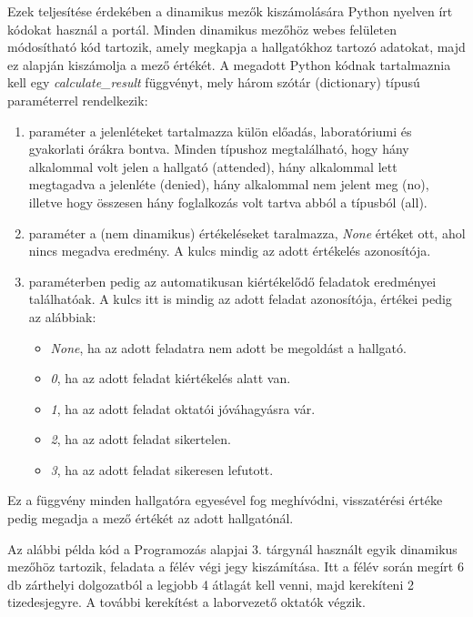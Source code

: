 Ezek teljesítése érdekében a dinamikus mezők kiszámolására Python nyelven írt kódokat használ a portál. Minden dinamikus mezőhöz webes felületen módosítható kód tartozik, amely megkapja a hallgatókhoz tartozó adatokat, majd ez alapján kiszámolja a mező értékét. A megadott Python kódnak tartalmaznia kell egy \textit{calculate\_result} függvényt, mely három szótár (dictionary) típusú paraméterrel rendelkezik:

\begin{enumerate}
    \item paraméter a jelenléteket tartalmazza külön előadás, laboratóriumi és gyakorlati órákra bontva. Minden típushoz megtalálható, hogy hány alkalommal volt jelen a hallgató (attended), hány alkalommal lett megtagadva a jelenléte (denied), hány alkalommal nem jelent meg (no), illetve hogy összesen hány foglalkozás volt tartva abból a típusból (all).
    \item paraméter a (nem dinamikus) értékeléseket taralmazza, \textit{None} értéket ott, ahol nincs megadva eredmény. A kulcs mindig az adott értékelés azonosítója.
    \item paraméterben pedig az automatikusan kiértékelődő feladatok eredményei találhatóak. A kulcs itt is mindig az adott feladat azonosítója, értékei pedig az alábbiak: 
    \begin{itemize}
        \item \textit{None}, ha az adott feladatra nem adott be megoldást a hallgató.
        \item \textit{0}, ha az adott feladat kiértékelés alatt van.
        \item \textit{1}, ha az adott feladat oktatói jóváhagyásra vár.
        \item \textit{2}, ha az adott feladat sikertelen.
        \item \textit{3}, ha az adott feladat sikeresen lefutott.
    \end{itemize}
\end{enumerate}

Ez a függvény minden hallgatóra egyesével fog meghívódni, visszatérési értéke pedig megadja a mező értékét az adott hallgatónál.

Az alábbi példa kód a Programozás alapjai 3. tárgynál használt egyik dinamikus mezőhöz tartozik, feladata a félév végi jegy kiszámítása. Itt a félév során megírt 6 db zárthelyi dolgozatból a legjobb 4 átlagát kell venni, majd kerekíteni 2 tizedesjegyre. A további kerekítést a laborvezető oktatók végzik.

